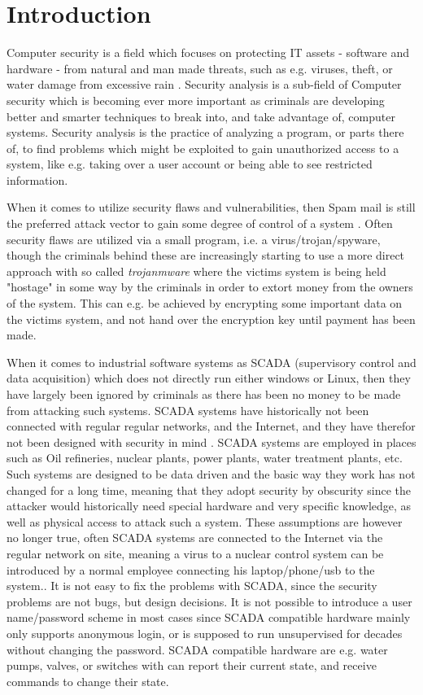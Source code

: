 \section{Introduction} \label{sec:intro}

Computer security is a field which focuses on protecting IT assets - software and hardware - from natural and man made threats, such as e.g. viruses, theft, or water damage from excessive rain \cite{v11}.
Security analysis is a sub-field of Computer security which is becoming ever more important as criminals are developing better and smarter techniques to break into, and take advantage of, computer systems\cite{v10}. Security analysis is the practice of analyzing a program, or  parts there of, to find problems which might be exploited to gain unauthorized access to a system, like e.g. taking over a user account or being able to see restricted information.

When it comes to utilize security flaws and vulnerabilities, then Spam mail is still the preferred attack vector to gain some degree of control of a system \cite{v12}. Often security flaws are utilized via a small program, i.e. a virus/trojan/spyware, though the criminals behind these are increasingly starting to use a more direct approach with so called \textit{trojanmware} where the victims system is being held "hostage" in some way by the criminals in order to extort money from the owners of the system. This can e.g. be achieved by encrypting some important data on the victims system, and not hand over the encryption key until payment has been made. 

When it comes to industrial software systems as SCADA (supervisory control and data acquisition) which does not directly run either windows or Linux, then they have largely been ignored by criminals as there has been no money to be made from attacking such systems. SCADA systems have historically not been connected with regular regular networks, and the Internet, and they have therefor not been designed with security in mind \cite{v13}. SCADA systems are employed in places such as Oil refineries, nuclear plants, power plants, water treatment plants, etc. Such systems are designed to be data driven and the basic way they work has not changed for a long time, meaning that they adopt security by obscurity since the attacker would historically need special hardware and very specific knowledge, as well as physical access to attack such a system. These assumptions are however no longer true, often SCADA systems are connected to the Internet via the regular network on site, meaning a virus to a nuclear control system can be introduced by a normal employee connecting his laptop/phone/usb to the system.\cite{v4, v2}. 
It is not easy to fix the problems with SCADA, since the security problems are not bugs, but design decisions. It is not possible to introduce a user name/password scheme in most cases since SCADA compatible hardware mainly only supports anonymous login, or is supposed to run unsupervised for decades without changing the password. SCADA compatible hardware are e.g. water pumps, valves, or switches with can report their current state, and receive commands to change their state.  

